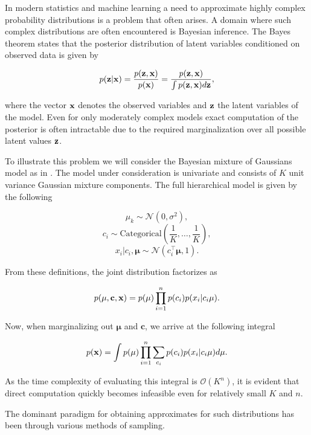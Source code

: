 In modern statistics and machine learning a need to approximate highly complex probability distributions is a problem that often arises. A domain where such complex distributions are often encountered is Bayesian inference. The Bayes theorem states that the posterior distribution of latent variables conditioned on observed data is given by

$$p(\mathbf{z} \vert \mathbf{x}) = \frac{p(\mathbf{z}, \mathbf{x})}{p(\mathbf{x})} = \frac{p(\mathbf{z}, \mathbf{x})}{\int p(\mathbf{z}, \mathbf{x}) d\mathbf{z}},$$

where the vector $\mathbf{x}$ denotes the observed variables and $\mathbf{z}$ the latent variables of the model. Even for only moderately complex models exact computation of the posterior is often intractable due to the required marginalization over all possible latent values $\mathbf{z}$.

To illustrate this problem we will consider the Bayesian mixture of Gaussians model as in \cite{variational_inference_review}. The model under consideration is univariate and consists of $K$ unit variance Gaussian mixture components. The full hierarchical model is given by the following

$$\mu_k \sim \mathcal{N}(0, \sigma^2),$$
$$c_i \sim \text{Categorical}(\frac{1}{K}, \dotsc, \frac{1}{K}),$$
$$x_i \vert c_i, \mathbf{\mu} \sim \mathcal{N}(c^{\top}_i \mathbf{\mu}, 1).$$

From these definitions, the joint distribution factorizes as

$$p(\mathbf{\mu}, \mathbf{c}, \mathbf{x}) = p(\mathbf{\mu}) \prod_{i=1}^{n} p(c_i) p(x_i \vert c_i \mathbf{\mu}).$$

Now, when marginalizing out $\mathbf{\mu}$ and $\mathbf{c}$, we arrive at the following integral

$$p(\mathbf{x}) = \int p(\mathbf{\mu}) \prod_{i=1}^{n} \sum_{c_i} p(c_i) p(x_i \vert c_i \mathbf{\mu}) d\mathbf{\mu}.$$

As the time complexity of evaluating this integral is $\mathcal{O}(K^n)$, it is evident that direct computation quickly becomes infeasible even for relatively small $K$ and $n$.

The dominant paradigm for obtaining approximates for such distributions has been through various methods of sampling.  

